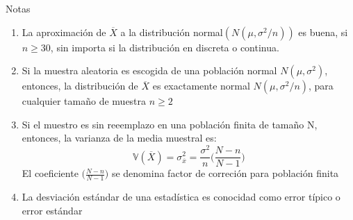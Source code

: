 \documentclass[
  ignorenonframetext,
]{beamer}
\begin{document}
\begin{frame}{Notas}

\begin{enumerate}
\justifying

  \item La aproximación de $\overline{X}$ a la distribución normal$(N(\mu, \sigma^2/n))$ es buena, si $n\geq 30$, sin importa si la distribución en discreta o continua.
  \item Si la muestra aleatoria es escogida de una población normal $N(\mu, \sigma^2)$, entonces, la distribución de $\overline{X}$ es exactamente normal $N(\mu, \sigma^2/n)$, para cualquier tamaño de muestra $n \geq 2$
  \item Si el muestro es sin reeemplazo en una población finita de tamaño N, entonces, la varianza de la media muestral es:
    $$ \displaystyle \mathbb{V}(\overline{X})=\sigma_{\overline{x}}^{2}=\frac{\sigma^2}{n}\Bigg(\frac{N-n}{N-1}\Bigg)$$
  El coeficiente $\Bigg(\frac{N-n}{N-1}\Bigg)$ se denomina factor de correción para población finita
  \item La desviación estándar de una estadística es conocidad como error típico o error estándar
\end{enumerate}

\end{frame}

\hypertarget{section-9}{%
\subsection{}\label{section-9}}
\end{document}
